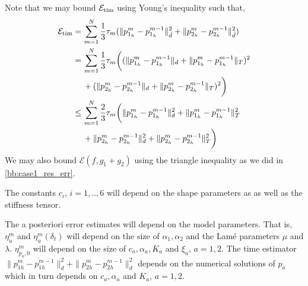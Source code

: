 %
\begin{remark}
Note that we may bound $\mathcal{E}_{\textnormal{tim}}$ using Young's inequality such that, 
\begin{align*}
\mathcal{E}_{\textnormal{tim}} = & \,\sum_{m=1}^N \frac{1}{3}\tau_m (\|p^m_{1_h} - p^{m-1}_{1_h}\|_{\hat{d}}^2 + \|p^m_{2_h} - p^{m-1}_{2_h}\|_{\hat{d}}^2) \\ 
= & \,\sum_{m=1}^N \frac{1}{3}\tau_m \biggl( (\|p^m_{1_h} - p^{m-1}_{1_h}\|_d + \|p^m_{1_h} - p^{m-1}_{1_h}\|_T)^2 \\
& \, + (\|p^m_{2_h} - p^{m-1}_{2_h}\|_{d} + \|p^m_{2_h} - p^{m-1}_{2_h}\|_{T})^2 \biggr)\\
\leq & \, \sum_{m=1}^N \frac{2}{3}\tau_m \biggl(\|p^m_{1_h} - p^{m-1}_{1_h}\|^2_d + \|p^m_{1_h} - p^{m-1}_{1_h}\|_T^2 \\
& \, + \|p^m_{2_h} - p^{m-1}_{2_h}\|^2_{d} + \|p^m_{2_h} - p^{m-1}_{2_h}\|_{T}^2 \biggr)
\end{align*}
We may also bound $\mathcal{E}(f,g_1+g_2)$ using the triangle inequality as we did in \ref{bb:case1_res_err}. 
\end{remark}
\begin{remark}
The constants $c_i$, $i=1,..,6$ will depend on the shape parameters as as well as the stiffness tensor. 
\end{remark}
\begin{remark}
The a posteriori error estimates will depend on the model parameters. That is, $\eta^m_u$ and $\eta^m_u(\delta_t)$ will depend on the size of $\alpha_1, \alpha_2$ and the Lamé parameters $\mu$ and $\lambda$. $\eta^m_{p_a,0}$  will depend on the size of $c_a, \alpha_a, K_a$ and $\xi_a$, $a=1,2$. The time estimator $ \|p^m_{1h} - p^{m-1}_{1h}\|_d^2 + \|p^m_{2h} - p^{m-1}_{2h}\|_d^2$ depends on the numerical solutions of $p_a$ which in turn depends on $c_a, \alpha_a$ and $K_a$, $a=1,2$.
\end{remark}
